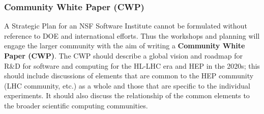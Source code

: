 \begin{frame}
\frametitle{Community White Paper (CWP)}

\noindent A Strategic Plan for an NSF Software Institute cannot be formulated without reference to DOE and international efforts. Thus the workshops and planning will engage the larger community with the aim of writing a {\bf Community White Paper (CWP)}.
\vskip 0.15in
\noindent The CWP should describe a global vision and roadmap for R\&D for 
software and computing 
for the HL-LHC era and HEP in the 2020s; this should include discussions of 
elements that are common to
the HEP community (LHC community, etc.) as a whole and those that are specific
to the individual experiments.
It should also discuss the relationship of the common elements
to the broader scientific computing communities.

\end{frame}


